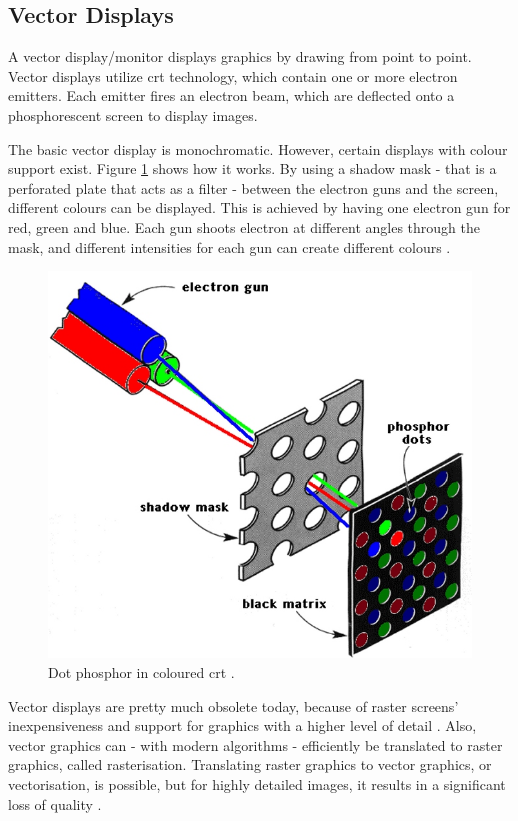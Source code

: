 \subsection{Vector Displays}
A vector display/monitor displays graphics by drawing from point to point.
Vector displays utilize \gls{crt} technology, which contain one or more electron emitters. Each emitter fires an electron beam, which are deflected onto a phosphorescent screen to display images.

The basic vector display is monochromatic.
However, certain displays with colour support exist.
Figure \ref{fig:color_crt} shows how it works.
By using a shadow mask - that is a perforated plate that acts as a filter - between the electron guns and the screen, different colours can be displayed.
This is achieved by having one electron gun for red, green and blue.
Each gun shoots electron at different angles through the mask, and different intensities for each gun can create different colours \cite{monitors}.

\begin{figure}
	\centering
	\includegraphics[width=0.5 \textwidth]{images/color_crt.jpg}
	\caption{Dot phosphor in coloured \gls{crt} \cite{monitors}.}
	\label{fig:color_crt}
\end{figure}

Vector displays are pretty much obsolete today, because of raster screens' inexpensiveness and support for graphics with a higher level of detail \cite{lcd-vs-crt}.
Also, vector graphics can - with modern algorithms - efficiently be translated to raster graphics, called rasterisation.
Translating raster graphics to vector graphics, or vectorisation, is possible, but for highly detailed images, it results in a significant loss of quality \cite{vectorisation}.
